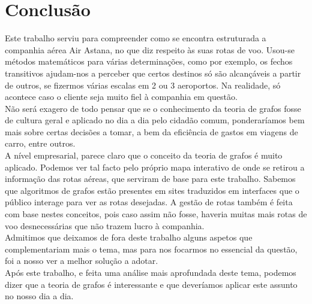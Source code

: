 \chapter{Conclusão}
Este trabalho serviu para compreender como se encontra estruturada a companhia aérea Air Astana, no que diz respeito às suas rotas de voo. Usou-se métodos matemáticos para várias determinações, como por exemplo, os fechos transitivos ajudam-nos a perceber que certos destinos só são alcançáveis a partir de outros, se fizermos várias escalas em 2 ou 3 aeroportos. Na realidade, só acontece caso o cliente seja muito fiel à companhia em questão.\\
\indent Não será exagero de todo pensar que se o conhecimento da teoria de grafos fosse de cultura geral e aplicado no dia a dia pelo cidadão comum, ponderaríamos bem mais sobre certas decisões a tomar, a bem da eficiência de gastos em viagens de carro, entre outros.\\
\indent A nível empresarial, parece claro que o conceito da teoria de grafos é muito aplicado. Podemos ver tal facto pelo próprio mapa interativo de onde se retirou a informação das rotas aéreas, que serviram de base para este trabalho. Sabemos que algoritmos de grafos estão presentes em sites traduzidos em interfaces que o público interage para ver as rotas desejadas. A gestão de rotas também é feita com base nestes conceitos, pois caso assim não fosse, haveria muitas mais rotas de voo desnecessárias que não trazem lucro à companhia.\\
\indent Admitimos que deixamos de fora deste trabalho alguns aspetos que complementariam mais o tema, mas para nos focarmos no essencial da questão, foi a nosso ver a melhor solução a adotar.\\
\indent Após este trabalho, e feita uma análise mais aprofundada deste tema, podemos dizer que a teoria de grafos é interessante e que deveríamos aplicar este assunto no nosso dia a dia.